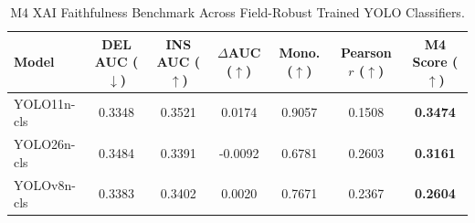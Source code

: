 \begin{table}[htbp]
\centering
\caption{M4 XAI Faithfulness Benchmark Across Field-Robust Trained YOLO Classifiers.}
\label{tab:m4_faithfulness_robust_3models}
\begin{tabular}{lcccccc}
\toprule
\textbf{Model} & \textbf{DEL AUC} ($\downarrow$) & \textbf{INS AUC} ($\uparrow$) & \textbf{$\Delta$AUC} ($\uparrow$) & \textbf{Mono.} ($\uparrow$) & \textbf{Pearson $r$} ($\uparrow$) & \textbf{M4 Score} ($\uparrow$) \\
\midrule
YOLO11n-cls & 0.3348 & 0.3521 & 0.0174 & 0.9057 & 0.1508 & \textbf{0.3474} \\
YOLO26n-cls & 0.3484 & 0.3391 & -0.0092 & 0.6781 & 0.2603 & \textbf{0.3161} \\
YOLOv8n-cls & 0.3383 & 0.3402 & 0.0020 & 0.7671 & 0.2367 & \textbf{0.2604} \\
\bottomrule
\end{tabular}
\end{table}
